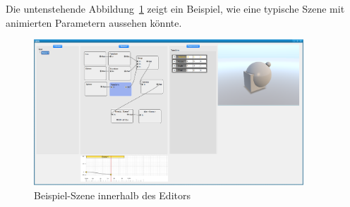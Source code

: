 Die untenstehende Abbildung~\ref{fig:main-components:editor:editor-scene1} zeigt ein Beispiel, wie eine typische Szene
mit animierten Parametern aussehen könnte.

\begin{figure}[H]
    \centering
    \includegraphics[width=0.9\textwidth]{img/editor_scene1.png}
    \caption{Beispiel-Szene innerhalb des Editors
        \protect\footnotemark}\label{fig:main-components:editor:editor-scene1}
\end{figure}
